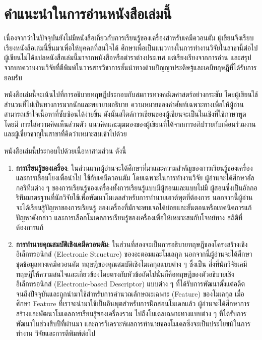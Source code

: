 

{

\chapter*{\centering คำแนะนำในการอ่านหนังสือเล่มนี้}

เนื่องจากว่าในปัจจุบันยังไม่มีหนังสือเกี่ยวกับการเรียนรู้ของเครื่องสำหรับเคมีควอนตัม ผู้เขียนจึงเรียบเรียงหนังสือเล่มนี้ขึ้นมาเพื่อให้บุคคลที่สนใจได้%
ศึกษาเพื่อเป็นแนวทางในการทำงานวิจัยในสาขานี้ต่อไป ผู้เขียนไม่ได้แปลหนังสือเล่มนี้มาจากหนังสือหรือตำราต่างประเทศ แต่เรียงเรียงจากการอ่าน%
และสรุปจากบทความงานวิจัยที่ตีพิมพ์ในวารสารวิชาการชั้นนำทางด้านปัญญาประดิษฐ์และเคมีทฤษฎีที่ได้รับการยอมรับ

หนังสือเล่มนี้จะเน้นไปที่การอธิบายทฤษฏีประกอบกับสมการทางคณิตศาสตร์อย่างกระชับ โดยผู้เขียนใช้สำนวนที่ไม่เป็นทางการมากนักและพยายามอธิบาย%
ความหมายของคำศัพท์เฉพาะทางเพื่อให้ผู้อ่านสามารถเข้าใจเนื้อหาที่ซับซ้อนได้ง่ายขึ้น ดังนั้นสไตล์การเขียนของผู้เขียนจะเป็นในเชิงที่ใช้ภาษาพูด โดยมี%
การใส่ความคิดเห็นส่วนตัว แนวคิดและมุมมองของผู้เขียนที่ได้จากการอภิปรายกับเพื่อนร่วมงานและผู้เชี่ยวชาญในสาขาที่คิดว่าเหมาะสมเข้าไปด้วย

หนังสือเล่มนี้ประกอบไปด้วยเนื้อหาสามส่วน ดังนี้ 
%
\begin{enumerate}[topsep=0pt]
    \item \textbf{การเรียนรู้ของเครื่อง}: ในส่วนแรกผู้อ่านจะได้ศึกษาที่มาและความสำคัญของการเรียนรู้ของเครื่องและการเชื่อมโยงเพื่อนำไป%
    ใช้กับเคมีควอนตัม โดยเฉพาะในการทำงานวิจัย ผู้อ่านจะได้ศึกษาอัลกอริทึมต่าง ๆ ของการเรียนรู้ของเครื่องทั้งการเรียนรู้แบบมีผู้สอนและแบบไม่มี%
    ผู้สอนซึ่งเป็นอัลกอริทึมมาตรฐานที่นักวิจัยใช้เพื่อพัฒนาโมเดลสำหรับการทำนายเอาต์พุตที่ต้องการ นอกจากนี้ผู้อ่านจะได้เรียนรู้ปัญหาของการเรียนรู้%
    ของเครื่องที่มักจะพบเจอได้บ่อยและขั้นตอนหรือเทคนิคการแก้ปัญหาดังกล่าว และการเลือกโมเดลการเรียนรู้ของเครื่องเพื่อให้เหมาะสมกับโจทย์ทาง%
    สถิติที่ต้องการแก้
    
    \item \textbf{การทำนายคุณสมบัติเชิงเคมีควอนตัม}: ในส่วนที่สองจะเป็นการอธิบายทฤษฎีของโครงสร้างเชิงอิเล็กทรอนิกส์ (Electronic 
    Structure) ของอะตอมและโมเลกุล นอกจากนี้ผู้อ่านจะได้ศึกษาชุดข้อมูลทางเคมีควอนตัม ทฤษฎีของคุณสมบัติเชิงโมเลกุลแบบต่าง ๆ ซึ่งเป็น%
    สิ่งที่นักวิจัยเคมีทฤษฎีให้ความสนใจและเกี่ยวข้องโดยตรงกับหัวข้อถัดไปนั่นก็คือทฤษฎีของตัวอธิบายเชิงอิเล็กทรอนิกส์ (Electronic-based 
    Descriptor) แบบต่าง ๆ ที่ได้รับการพัฒนาตั้งแต่อดีตจนถึงปัจจุบันและถูกนำมาใช้สำหรับการคำนวณลักษณะเฉพาะ (Feature) ของโมเลกุล 
    เมื่อศึกษา Feature ที่เราจะนำมาใช้เป็นอินพุตสำหรับการฝึกสอนโมเดลแล้ว ผู้อ่านจะได้ศึกษาการสร้างและพัฒนาโมเดลการเรียนรู้ของเครื่องรวม%
    ไปถึงโมเดลเฉพาะทางแบบต่าง ๆ ที่ได้รับการพัฒนาในช่วงสิบปีที่ผ่านมา และการวิเคราะห์ผลการทำนายของโมเดลซึ่งจะเป็นประโยชน์ในการทำงาน%
    วิจัยและการตีพิมพ์ต่อไป


\end{enumerate}}
